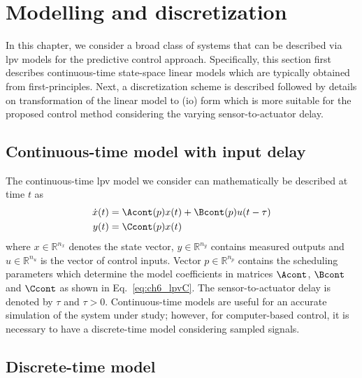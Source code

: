 \section{Modelling and discretization}\label{sec:ch6_modeling}
In this chapter, we consider a broad class of systems that can be described via \gls{lpv} models for the predictive control approach. Specifically, this section first describes continuous-time state-space linear models which are typically obtained from first-principles. Next, a discretization scheme is described followed by details on transformation of the linear model to (\gls{io}) form which is more suitable for the proposed control method considering the varying sensor-to-actuator delay.
\subsection{Continuous-time model with input delay}
The continuous-time \gls{lpv} model we consider can mathematically be described at time $t$ as
\begin{subequations}\label{eq:ch6_lpvC}
\begin{align}
    \dot x(t) &= \Acont (p) x(t) + \Bcont (p) u(t - \tau)
    \\
    y(t) &= \Ccont (p) x(t)
\end{align}
\end{subequations}
where $x \in \mathbb{R}^{n_x}$ denotes the state vector, $y \in \mathbb{R}^{n_y}$ contains measured outputs and $u \in \mathbb{R}^{n_u}$ is the vector of control inputs. Vector $p \in \mathbb{R}^{n_{p}}$ contains the scheduling parameters which determine the model coefficients in matrices $\Acont$, $\Bcont$ and $\Ccont$ as shown in Eq.~\eqref{eq:ch6_lpvC}. 
The sensor-to-actuator delay is denoted by $\tau$ and $\tau>0$. Continuous-time models are useful for an accurate simulation of the system under study; however, for computer-based control, it is necessary to have a discrete-time model considering sampled signals. 
\subsection{Discrete-time model}\label{sec:ch6_discmodel}

